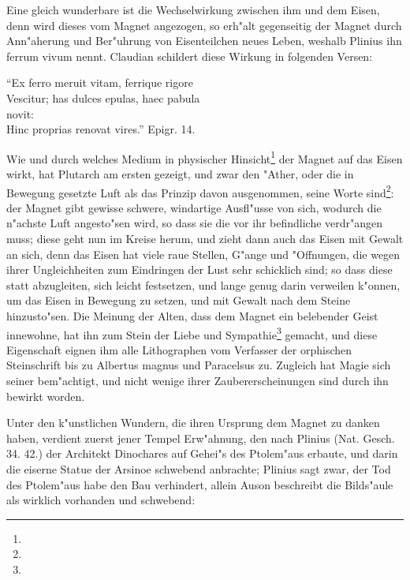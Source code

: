 \documentclass[a4paper, 11pt, oneside, polutonikogreek, german]{article}
\begin{document}
Eine gleich wunderbare ist die Wechselwirkung zwischen ihm und dem Eisen, denn wird dieses vom Magnet angezogen, so erh"alt gegenseitig der Magnet durch Ann"aherung und Ber"uhrung von Eisenteilchen neues Leben, weshalb Plinius ihn ferrum vivum nennt. Claudian schildert diese Wirkung in folgenden Versen:

"`Ex ferro meruit vitam, ferrique rigore\\
\hspace*{0.5cm} Vescitur; has dulces epulas, haec pabula\\
\hspace*{1.5cm} novit:\\
\hspace*{0.5cm} Hinc proprias renovat vires."' Epigr. 14.

Wie und durch welches Medium in physischer Hinsicht\footnote{} der Magnet auf das Eisen wirkt, hat Plutarch am ersten gezeigt, und zwar den "Ather, oder die in Bewegung gesetzte Luft als das Prinzip davon ausgenommen, seine Worte sind\footnote{}: der Magnet gibt gewisse schwere, windartige Ausfl"usse von sich, wodurch die n"achste Luft angesto"sen wird, so dass sie die vor ihr befindliche verdr"angen muss; diese geht nun im Kreise herum, und zieht dann auch das Eisen mit Gewalt an sich, denn das Eisen hat viele raue Stellen, G"ange und "Offnungen, die wegen ihrer Ungleichheiten zum Eindringen der Lust sehr schicklich sind; so dass diese statt abzugleiten, sich leicht festsetzen, und lange genug darin verweilen k"onnen, um das Eisen in Bewegung zu setzen, und mit Gewalt nach dem Steine hinzusto"sen. Die Meinung der Alten, dass dem Magnet ein belebender Geist innewohne, hat ihn zum Stein der Liebe und Sympathie\footnote{} gemacht, und diese Eigenschaft eignen ihm alle Lithographen vom Verfasser der orphischen Steinschrift bis zu Albertus magnus und Paracelsus zu. Zugleich hat Magie sich seiner bem"achtigt, und nicht wenige ihrer Zaubererscheinungen sind durch ihn bewirkt worden.

Unter den k"unstlichen Wundern, die ihren Ursprung dem Magnet zu danken haben, verdient zuerst jener Tempel Erw"ahnung, den nach Plinius (Nat. Gesch. 34. 42.) der Architekt Dinochares auf Gehei"s des Ptolem"aus erbaute, und darin die eiserne Statue der Arsinoe schwebend anbrachte; Plinius sagt zwar, der Tod des Ptolem"aus habe den Bau verhindert, allein Auson beschreibt die Bilds"aule als wirklich vorhanden und schwebend:
\end{document}
